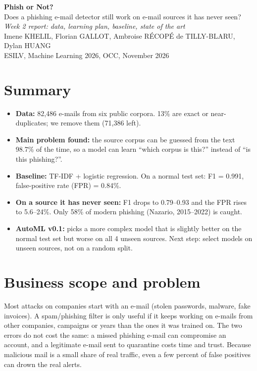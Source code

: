 \documentclass[11pt,a4paper]{article}
\begin{document}
\begin{center}
{\LARGE\bfseries\color{title} Phish or Not?}\\[6pt]
{\large Does a phishing e-mail detector still work on e-mail sources it has never seen?}\\[14pt]
\textit{Week 2 report: data, learning plan, baseline, state of the art}\\[4pt]
Imene KHELIL, Florian GALLOT, Ambroise RÉCOPÉ de TILLY-BLARU, Dylan HUANG\\[2pt]
{\small ESILV, Machine Learning 2026, OCC, November 2026}
\end{center}

\section*{Summary}
\begin{itemize}
\item \textbf{Data:} 82,486 e-mails from six public corpora. 13\% are exact or near-duplicates; we remove them (71,386 left).
\item \textbf{Main problem found:} the source corpus can be guessed from the text 98.7\% of the time, so a model can learn ``which corpus is this?'' instead of ``is this phishing?''.
\item \textbf{Baseline:} TF-IDF + logistic regression. On a normal test set: F1 = 0.991, false-positive rate (FPR) = 0.84\%.
\item \textbf{On a source it has never seen:} F1 drops to 0.79--0.93 and the FPR rises to 5.6--24\%. Only 58\% of modern phishing (Nazario, 2015--2022) is caught.
\item \textbf{AutoML v0.1:} picks a more complex model that is slightly better on the normal test set but worse on all 4 unseen sources. Next step: select models on unseen sources, not on a random split.
\end{itemize}

\section{Business scope and problem}
Most attacks on companies start with an e-mail (stolen passwords, malware, fake invoices). A spam/phishing filter is only useful if it keeps working on e-mails from other companies, campaigns or years than the ones it was trained on. The two errors do not cost the same: a missed phishing e-mail can compromise an account, and a legitimate e-mail sent to quarantine costs time and trust. Because malicious mail is a small share of real traffic, even a few percent of false positives can drown the real alerts.
\end{document}
